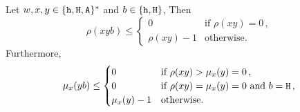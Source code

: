 \begin{proposition}\label{prop:mu-upperbound}
  Let $w,x, y \in \{\mathtt{h}, \mathtt{H}, \mathtt{A}\}^*$ 
  and $b \in \{\mathtt{h}, \mathtt{H}\}$, 
  Then 
  \begin{equation}
    \rho(xyb) \leq \begin{cases}
      0 & \text{if $\rho(xy) = 0$}\,, \\
      \rho(xy) - 1 & \text{otherwise.}
    \end{cases}
    \label{eq:rho-upperbound}
  \end{equation}
  Furthermore,
  \begin{equation}
    \mu_x(yb) \leq \begin{cases}
      0 & \text{if $\rho(xy) > \mu_x(y)=0$}\,, \\
      0 & \text{if $\rho(xy) = \mu_x(y) = 0$ and $b = \mathtt{H}$}\,, \\
      \mu_x(y)-1 & \text{otherwise.}
    \end{cases}
    \label{eq:mu-upperbound}
  \end{equation}
\end{proposition}

